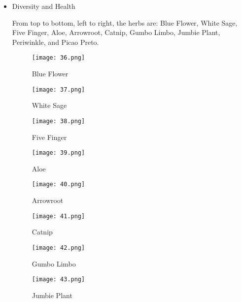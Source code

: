\documentclass{article}
\begin{document}
\begin{itemize}
\item Diversity and Health\par
From top to bottom, left to right, the herbs are: Blue Flower, White Sage, Five Finger, Aloe, Arrowroot, Catnip, Gumbo Limbo, Jumbie Plant, Periwinkle, and Picao Preto.

\begin{figure}[H]
\centering
\begin{minipage}{0.5\textwidth}
\texttt{[image: 36.png]}
\caption{Blue Flower}
\end{minipage}%
\begin{minipage}{0.5\textwidth}
\texttt{[image: 37.png]}
\caption{White Sage}
\end{minipage}
\end{figure}

\begin{figure}[H]
\centering
\begin{minipage}{0.5\textwidth}
\texttt{[image: 38.png]}
\caption{Five Finger}
\end{minipage}%
\begin{minipage}{0.5\textwidth}
\texttt{[image: 39.png]}
\caption{Aloe}
\end{minipage}
\end{figure}

\begin{figure}[H]
\centering
\begin{minipage}{0.5\textwidth}
\texttt{[image: 40.png]}
\caption{Arrowroot}
\end{minipage}%
\begin{minipage}{0.5\textwidth}
\texttt{[image: 41.png]}
\caption{Catnip}
\end{minipage}
\end{figure}

\begin{figure}[H]
\centering
\begin{minipage}{0.5\textwidth}
\texttt{[image: 42.png]}
\caption{Gumbo Limbo}
\end{minipage}%
\begin{minipage}{0.5\textwidth}
\texttt{[image: 43.png]}
\caption{Jumbie Plant}
\end{minipage}
\end{figure}


\end{itemize}
\end{document}
